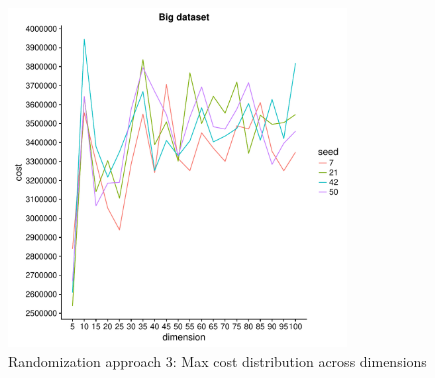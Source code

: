 \documentclass[a4paper,10pt]{article}
\theoremstyle{plain}
\theoremstyle{definition}
\begin{document}
\begin{figure}[H]
	\centering
	\includegraphics[width=0.8\textwidth]{./plots/plotMaxCostRandomBig/plotCostsRandomBigData-Ap3.pdf}
	\caption{Randomization approach 3: Max cost distribution across dimensions}
	\label{fig:plotCostsRandomBigDataAp3}
\end{figure}
\end{document}
